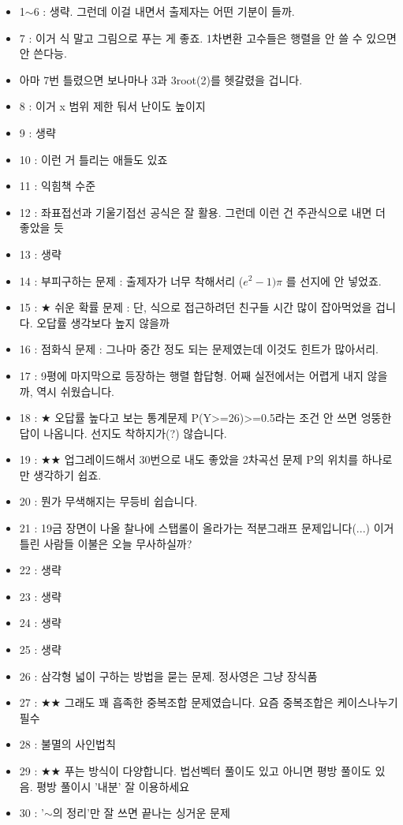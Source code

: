 \begin{itemize}
    \item 1$\sim$6 : 생략. 그런데 이걸 내면서 출제자는 어떤 기분이 들까.
    \item 7 : 이거 식 말고 그림으로 푸는 게 좋죠. 1차변환 고수들은 행렬을 안 쓸 수 있으면 안 쓴다능.
    \item 아마 7번 틀렸으면 보나마나 3과 3root(2)를 헷갈렸을 겁니다.
    \item 8 : 이거 x 범위 제한 둬서 난이도 높이지
    \item 9 : 생략
    \item 10 : 이런 거 틀리는 애들도 있죠
    \item 11 : 익힘책 수준
    \item 12 : 좌표접선과 기울기접선 공식은 잘 활용. 그런데 이런 건 주관식으로 내면 더 좋았을 듯
    \item 13 : 생략
    \item 14 : 부피구하는 문제 :  출제자가 너무 착해서리 ($e^2-1)\pi$ 를 선지에 안 넣었죠.
    \item 15 : $\bigstar$ 쉬운 확률 문제 : 단, 식으로 접근하려던 친구들 시간 많이 잡아먹었을 겁니다. 오답률 생각보다 높지 않을까
    \item 16 : 점화식 문제 : 그나마 중간 정도 되는 문제였는데 이것도 힌트가 많아서리.
    \item 17 : 9평에 마지막으로 등장하는 행렬 합답형. 어째 실전에서는 어렵게 내지 않을까, 역시 쉬웠습니다.
    \item 18 : $\bigstar$ 오답률 높다고 보는 통계문제 P(Y>=26)>=0.5라는 조건 안 쓰면 엉뚱한 답이 나옵니다. 선지도 착하지가(?) 않습니다.
    \item 19 : $\bigstar$$\bigstar$ 업그레이드해서 30번으로 내도 좋았을 2차곡선 문제 P의 위치를 하나로만 생각하기 쉽죠.
    \item 20 : 뭔가 무색해지는 무등비 쉽습니다.
    \item 21 : 19금 장면이 나올 찰나에 스탭롤이 올라가는 적분그래프 문제입니다(...) 이거 틀린 사람들 이불은 오늘 무사하실까?
    \item 22 : 생략
    \item 23 : 생략
    \item 24 : 생략
    \item 25 : 생략
    \item 26 : 삼각형 넓이 구하는 방법을 묻는 문제. 정사영은 그냥 장식품
    \item 27 : $\bigstar$$\bigstar$ 그래도 꽤 흡족한 중복조합 문제였습니다. 요즘 중복조합은 케이스나누기 필수
    \item 28 : 불멸의 사인법칙
    \item 29 : $\bigstar$$\bigstar$ 푸는 방식이 다양합니다. 법선벡터 풀이도 있고 아니면 평방 풀이도 있음. 평방 풀이시 '내분' 잘 이용하세요
    \item 30 : '$\sim$의 정리'만 잘 쓰면 끝나는 싱거운 문제
\end{itemize}
\vspace{5mm}


